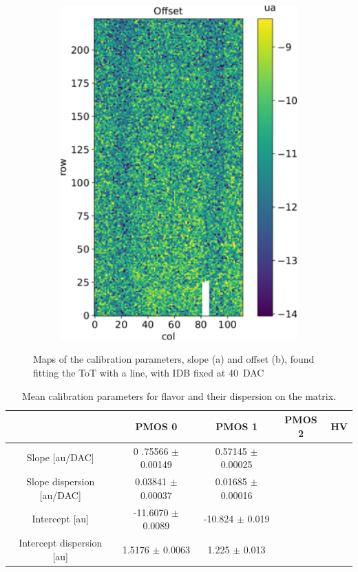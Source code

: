 \begin{figure}[h!]
\begin{subfigure}{.5\textwidth}
            \includegraphics[width=.9\linewidth]{figures/charaterization/offset_map.pdf}
            \end{subfigure}
            \label{fig:ToT_fit_param_map}
            \caption{Maps of the calibration parameters, slope (a) and offset (b), found fitting the ToT with a line, with IDB fixed at \SI{40}{DAC}}
        \end{figure} 
        
        \begin{table}
            \begin{center}
            \begin{tabular}{| c |  c | c | c |c |}
            \hline
            & PMOS 0 & PMOS 1 & PMOS 2 & HV \\
            \hline
            \hline
            Slope [au/DAC] & 0 .75566 $\pm$ 0.00149 & 0.57145 $\pm$ 0.00025 \\
            Slope dispersion [au/DAC] & 0.03841 $\pm$ 0.00037 & 0.01685 $\pm$ 0.00016\\
            Intercept [au] & -11.6070 $\pm$ 0.0089 & -10.824 $\pm$ 0.019 \\
            Intercept dispersion [au] & 1.5176 $\pm$ 0.0063 & 1.225 $\pm$ 0.013\\
            \hline
            \end{tabular}
            \caption{Mean calibration parameters for  flavor and their dispersion on the matrix. }
            \label{tab:calibration_param}
            \end{center}
        \end{table}        

